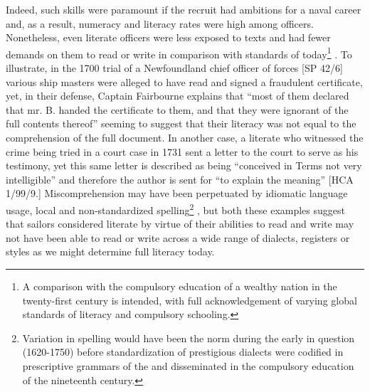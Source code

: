 Indeed, such skills were paramount if the recruit had ambitions for a naval career and, as a result, numeracy and literacy rates were high among officers. Nonetheless, even literate officers were less exposed to texts and had fewer demands on them to read or write in comparison with standards of today\footnote{A comparison with the compulsory education of a wealthy nation in the twenty-first century is intended, with full acknowledgement of varying global standards of literacy and compulsory schooling.} . To illustrate, in the 1700 trial of a Newfoundland chief officer of forces [SP 42/6] various ship masters were alleged to have read and signed a fraudulent certificate, yet, in their defense, Captain Fairbourne explains that “most of them declared that mr. B. handed the certificate to them, and that they were ignorant of the full contents thereof” seeming to suggest that their literacy was not equal to the comprehension of the full document. In another case, a literate  who witnessed the crime being tried in a court case in 1731 sent a letter to the court to serve as his testimony, yet this same letter is described as being “conceived in Terms not very intelligible” and therefore the author is sent for “to explain the meaning” [HCA 1/99/9.] Miscomprehension may have been perpetuated by idiomatic language usage, local  and non-standardized spelling\footnote{Variation in spelling would have been the norm during the early  in question (1620-1750) before standardization of prestigious dialects were codified in prescriptive grammars of the  and disseminated in the compulsory education of the nineteenth century.} , but both these examples suggest that sailors considered literate by virtue of their abilities to read and write may not have been able to read or write across a wide range of dialects, registers or styles as we might determine full literacy today.  

